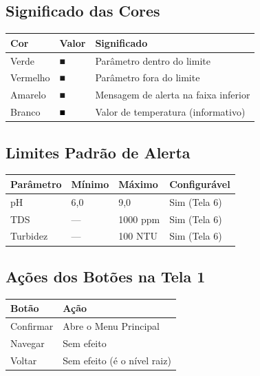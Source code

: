 \documentclass[12pt,a4paper]{article}
\begin{document}
\subsection{Significado das Cores}

\begin{tabularx}{\textwidth}{l l X}
\toprule
\textbf{Cor} & \textbf{Valor} & \textbf{Significado} \\
\midrule
Verde & \textcolor{verde}{■} & Parâmetro dentro do limite \\
Vermelho & \textcolor{vermelho}{■} & Parâmetro fora do limite \\
Amarelo & \textcolor{amarelo}{■} & Mensagem de alerta na faixa inferior \\
Branco & \textcolor{black}{■} & Valor de temperatura (informativo) \\
\bottomrule
\end{tabularx}

\subsection{Limites Padrão de Alerta}

\begin{tabularx}{\textwidth}{l l l X}
\toprule
\textbf{Parâmetro} & \textbf{Mínimo} & \textbf{Máximo} & \textbf{Configurável} \\
\midrule
pH & 6,0 & 9,0 & Sim (Tela 6) \\
TDS & --- & 1000 ppm & Sim (Tela 6) \\
Turbidez & --- & 100 NTU & Sim (Tela 6) \\
\bottomrule
\end{tabularx}

\subsection{Ações dos Botões na Tela 1}

\begin{tabularx}{\textwidth}{l X}
\toprule
\textbf{Botão} & \textbf{Ação} \\
\midrule
Confirmar & Abre o Menu Principal \\
Navegar & Sem efeito \\
Voltar & Sem efeito (é o nível raiz) \\
\bottomrule
\end{tabularx}

\end{document}
